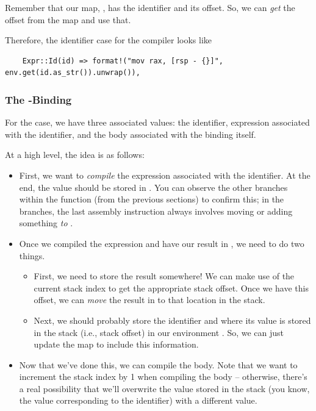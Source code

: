 \documentclass[letterpaper]{article}
\begin{document}
\bigskip 

Remember that our map, , has the identifier and its offset. So, we can \emph{get} the offset from the map and use that. 

\bigskip 

Therefore, the identifier case for the compiler looks like 
\begin{verbatim}
    Expr::Id(id) => format!("mov rax, [rsp - {}]", env.get(id.as_str()).unwrap()),\end{verbatim} 

\subsubsection{The -Binding}
For the  case, we have three associated values: the identifier, expression associated with the identifier, and the body associated with the binding itself. 

\bigskip 

At a high level, the idea is as follows:
\begin{itemize}
    \item First, we want to \emph{compile} the expression associated with the identifier. At the end, the value should be stored in . You can observe the other branches within the  function (from the previous sections) to confirm this; in the branches, the last assembly instruction always involves moving or adding something \emph{to} . 
    \item Once we compiled the expression and have our result in , we need to do two things. 
    \begin{itemize}
        \item First, we need to store the result somewhere! We can make use of the current stack index to get the appropriate stack offset. Once we have this offset, we can \emph{move} the result in  to that location in the stack.
        \item Next, we should probably store the identifier and where its value is stored in the stack (i.e., stack offset) in our environment . So, we can just update the map to include this information. 
    \end{itemize}
    \item Now that we've done this, we can compile the body. Note that we want to increment the stack index by 1 when compiling the body -- otherwise, there's a real possibility that we'll overwrite the value stored in the stack (you know, the value corresponding to the identifier) with a different value.
\end{itemize}
\end{document}
